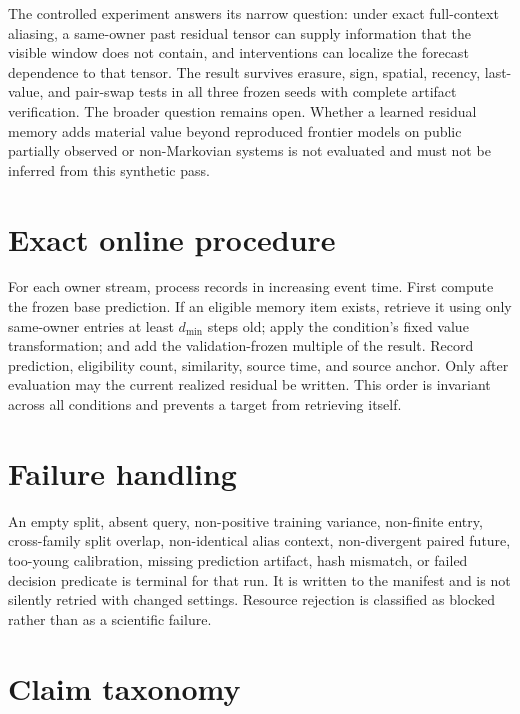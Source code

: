 \documentclass[11pt]{article}
\begin{document}
The controlled experiment answers its narrow question: under exact
full-context aliasing, a same-owner past residual tensor can supply information
that the visible window does not contain, and interventions can localize the
forecast dependence to that tensor. The result survives erasure, sign,
spatial, recency, last-value, and pair-swap tests in all three frozen seeds with
complete artifact verification. The broader question remains open. Whether a
learned residual memory adds material value beyond reproduced frontier models
on public partially observed or non-Markovian systems is not evaluated and must
not be inferred from this synthetic pass.

\appendix

\section{Exact online procedure}

For each owner stream, process records in increasing event time. First compute
the frozen base prediction. If an eligible memory item exists, retrieve it using
only same-owner entries at least $d_{\min}$ steps old; apply the condition's
fixed value transformation; and add the validation-frozen multiple of the
result. Record prediction, eligibility count, similarity, source time, and
source anchor. Only after evaluation may the current realized residual be
written. This order is invariant across all conditions and prevents a target
from retrieving itself.

\section{Failure handling}

An empty split, absent query, non-positive training variance, non-finite entry,
cross-family split overlap, non-identical alias context, non-divergent paired
future, too-young calibration, missing prediction artifact, hash mismatch, or
failed decision predicate is terminal for that run. It is written to the
manifest and is not silently retried with changed settings. Resource rejection
is classified as blocked rather than as a scientific failure.

\section{Claim taxonomy}
\end{document}
